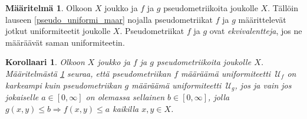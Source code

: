 \documentclass[12pt,a4paper,leqno]{report}
\newcommand{\U}{\,\mathcal{U}}
\theoremstyle{plain}
\newtheorem{kor}[equation]{Korollaari}
\theoremstyle{definition}
\newtheorem{maar}[equation]{Määritelmä}
\theoremstyle{remark}
\begin{document}
\begin{maar}\label{pseudo_equiv}
Olkoon $X$ joukko ja $f$ ja $g$ pseudometriikoita joukolle $X$. 
Tällöin lauseen \ref{pseudo_uniformi_maar} nojalla 
pseudometriikat $f$ ja $g$ määrittelevät jotkut uniformiteetit joukolle $X$.
Pseudometriikat $f$ ja $g$ ovat \emph{ekvivalentteja}, jos ne määräävät saman uniformiteetin.
\end{maar}
\begin{kor}
Olkoon $X$ joukko ja $f$ ja $g$ pseudometriikoita joukolle $X$. 
Määritelmästä \ref{pseudo_equiv} seuraa, että pseudometriikan $f$ määräämä uniformiteetti 
$\U_f$ 
on karkeampi kuin pseudometriikan $g$ määräämä uniformiteetti $\U_g$, jos ja vain jos jokaiselle 
$a\in[0,\infty]$ on olemassa sellainen $b\in[0,\infty]$, jolla $g(x,y)\leq b \Rightarrow f(x,y)\leq a$ kaikilla $x,y\in X$.


\end{kor}
\end{document}
